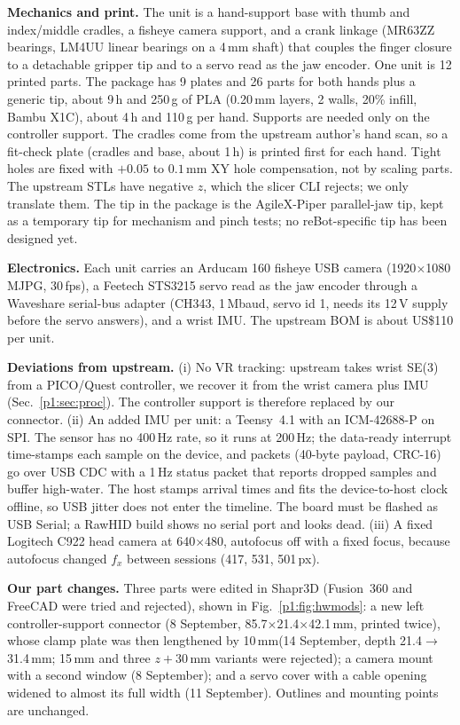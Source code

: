 \documentclass[conference,10pt]{IEEEtran}
\newcommand{\mm}{\,mm\xspace}
\begin{document}
\textbf{Mechanics and print.} The unit is a hand-support base with thumb and index/middle cradles, a fisheye camera support,
and a crank linkage (MR63ZZ bearings, LM4UU linear bearings on a 4\mm shaft) that couples the finger closure to a detachable
gripper tip and to a servo read as the jaw encoder. One unit is 12 printed parts. The package has 9 plates and 26 parts for both hands
plus a generic tip, about 9\,h and 250\,g of PLA (0.20\mm layers, 2 walls, 20\% infill, Bambu X1C), about 4\,h and 110\,g per
hand. Supports are needed only on the controller support. The cradles come from the upstream author's hand scan, so a
fit-check plate (cradles and base, about 1\,h) is printed first for each hand. Tight holes are fixed with $+0.05$ to $0.1$\mm XY
hole compensation, not by scaling parts. The upstream STLs have negative $z$, which the slicer CLI rejects; we only translate
them. The tip in the package is the AgileX-Piper parallel-jaw tip, kept as a temporary tip for mechanism and pinch tests; no
reBot-specific tip has been designed yet.

\textbf{Electronics.} Each unit carries an Arducam 160\textdegree{} fisheye USB camera (1920$\times$1080 MJPG, 30\,fps), a
Feetech STS3215 servo read as the jaw encoder through a Waveshare serial-bus adapter (CH343, 1\,Mbaud, servo id 1, needs its
12\,V supply before the servo answers), and a wrist IMU. The upstream BOM is about US\$110 per unit.

\textbf{Deviations from upstream.} (i) No VR tracking: upstream takes wrist SE(3) from a PICO/Quest controller, we recover it from
the wrist camera plus IMU (Sec.~\ref{p1:sec:proc}). The controller support is therefore replaced by our connector. (ii) An added
IMU per unit: a Teensy~4.1 with an ICM-42688-P on SPI. The sensor has no 400\,Hz rate, so it runs at 200\,Hz; the data-ready
interrupt time-stamps each sample on the device, and packets (40-byte payload, CRC-16) go over USB CDC with a 1\,Hz status
packet that reports dropped samples and buffer high-water. The host stamps arrival times and fits the device-to-host clock
offline, so USB jitter does not enter the timeline. The board must be flashed as USB Serial; a RawHID build shows no serial
port and looks dead. (iii) A fixed Logitech C922 head camera at 640$\times$480, autofocus off with a fixed focus, because
autofocus changed $f_x$ between sessions (417, 531, 501\,px).

\textbf{Our part changes.} Three parts were edited in Shapr3D (Fusion~360 and FreeCAD were tried and rejected), shown in
Fig.~\ref{p1:fig:hwmods}: a new left controller-support connector (8 September, 85.7$\times$21.4$\times$42.1\mm, printed twice),
whose clamp plate was then lengthened by 10\mm (14 September, depth 21.4$\to$31.4\mm; 15\mm and three $z{+}30$\mm variants
were rejected); a camera mount with a second window (8 September); and a servo cover with a cable opening widened to almost
its full width (11 September). Outlines and mounting points are unchanged.
\end{document}
